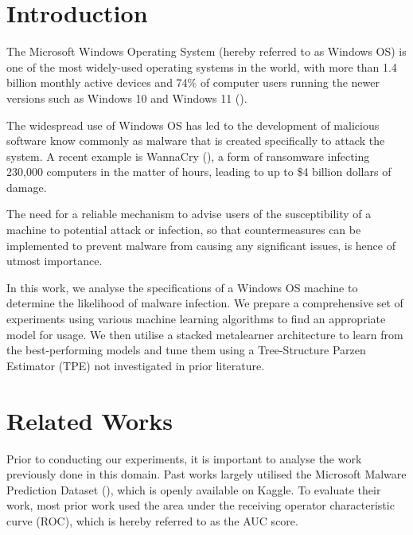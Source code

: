 \documentclass[pdflatex,sn-basic,10pt]{sn-jnl}%
\begin{document}



\maketitle

\section{Introduction}\label{sec:sec-intro}

The Microsoft Windows Operating System (hereby referred to as Windows OS) is one of the most widely-used operating systems in the world, with more than 1.4 billion monthly active devices and 74\% of computer users running the newer versions such as Windows 10 and Windows 11 (\cite{microsoftahaha}).

The widespread use of Windows OS has led to the development of malicious software know commonly as malware that is created specifically to attack the system. A recent example is WannaCry (\cite{trautman2018wannacry}), a form of ransomware infecting 230,000 computers in the matter of hours, leading to up to \$4 billion dollars of damage.

The need for a reliable mechanism to advise users of the susceptibility of a machine to potential attack or infection, so that countermeasures can be implemented to prevent malware from causing any significant issues, is hence of utmost importance.

In this work, we analyse the specifications of a Windows OS machine to determine the likelihood of malware infection. We prepare a comprehensive set of experiments using various machine learning algorithms to find an appropriate model for usage. We then utilise a stacked metalearner architecture to learn from the best-performing models and tune them using a Tree-Structure Parzen Estimator (TPE) not investigated in prior literature.


\section{Related Works}\label{sec:related-works}

Prior to conducting our experiments, it is important to analyse the work previously done in this domain. Past works largely utilised the Microsoft Malware Prediction Dataset (\cite{microsoft-malware-prediction}), which is openly available on Kaggle. To evaluate their work, most prior work used the area under the receiving operator characteristic curve (ROC), which is hereby referred to as the AUC score.
\end{document}
